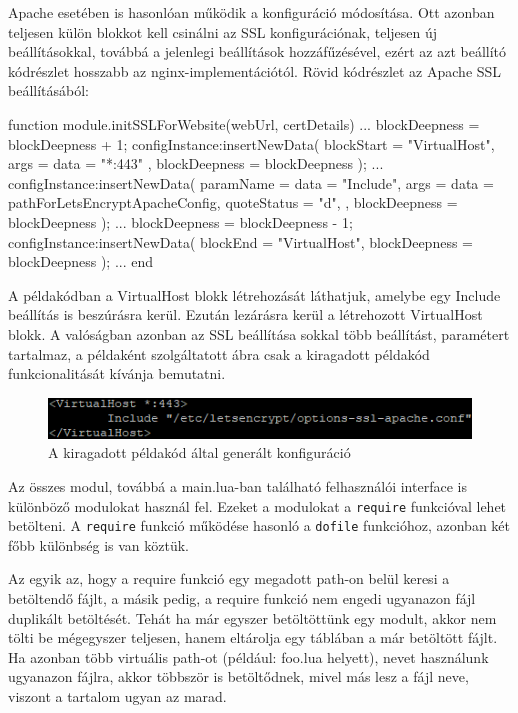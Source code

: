 Apache esetében is hasonlóan működik a konfiguráció módosítása. Ott azonban teljesen külön blokkot kell csinálni az SSL konfigurációnak, teljesen új beállításokkal, továbbá a jelenlegi beállítások hozzáfűzésével, ezért az azt beállító kódrészlet hosszabb az nginx-implementációtól. Rövid kódrészlet az Apache SSL beállításából:
\begin{lua}
function module.initSSLForWebsite(webUrl, certDetails)
  ...
  blockDeepness = blockDeepness + 1;
  configInstance:insertNewData({
    blockStart = "VirtualHost",
      args = {
          {data = "*:443"}
      },
      blockDeepness = blockDeepness
  });
  ...
  configInstance:insertNewData({
      paramName = {data = "Include"},
        args = {
          {data = pathForLetsEncryptApacheConfig, quoteStatus = "d"},
        },
       blockDeepness = blockDeepness
  });
  ...
  blockDeepness = blockDeepness - 1;
  configInstance:insertNewData({
    blockEnd = "VirtualHost",
    blockDeepness = blockDeepness
  });
  ...
end
\end{lua}

\pagebreak

A példakódban a VirtualHost blokk létrehozását láthatjuk, amelybe egy Include beállítás is beszúrásra kerül. Ezután lezárásra kerül a létrehozott VirtualHost blokk. A valóságban azonban az SSL beállítása sokkal több beállítást, paramétert tartalmaz, a példaként szolgáltatott  ábra csak a kiragadott példakód funkcionalitását kívánja bemutatni.
\begin{figure}[t]
\centering
\includegraphics[scale=1.0]{images/apache_config_edit_example.png}
\caption{A kiragadott példakód által generált konfiguráció}
\label{fig:newly_inserted_apache_block}
\end{figure}


Az összes modul, továbbá a main.lua-ban található felhasználói interface is különböző modulokat használ fel. Ezeket a modulokat a \texttt{require} funkcióval lehet betölteni. A \texttt{require} funkció működése hasonló a \texttt{dofile} funkcióhoz, azonban két főbb különbség is van köztük. 

Az egyik az, hogy a require funkció egy megadott path-on belül keresi a betöltendő fájlt, a másik pedig, a require funkció nem engedi ugyanazon fájl duplikált betöltését. Tehát ha már egyszer betöltöttünk egy modult, akkor nem tölti be mégegyszer teljesen, hanem eltárolja egy táblában a már betöltött fájlt. Ha azonban több virtuális path-ot (például: \texttt{} foo.lua helyett), nevet használunk ugyanazon fájlra, akkor többször is betöltődnek, mivel más lesz a fájl neve, viszont a tartalom ugyan az marad. \cite{require}

